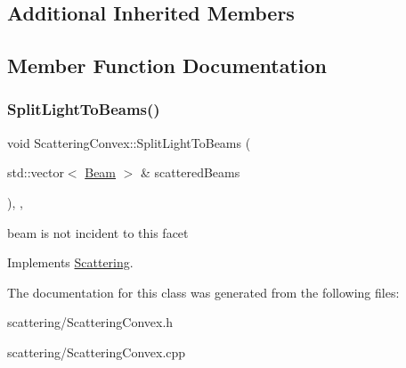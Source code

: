 \subsection*{Additional Inherited Members}


\subsection{Member Function Documentation}
\mbox{\label{class_scattering_convex_acb8aa7121ffd9dfb7bf1d51a0d68e93a}} 
\subsubsection{\texorpdfstring{Split\+Light\+To\+Beams()}{SplitLightToBeams()}}
{\footnotesize\ttfamily void Scattering\+Convex\+::\+Split\+Light\+To\+Beams (\begin{DoxyParamCaption}\item[{std\+::vector$<$ \mbox{\hyperlink{class_beam}{Beam}} $>$ \&}]{scattered\+Beams }\end{DoxyParamCaption})\hspace{0.3cm}{\ttfamily [override]}, {\ttfamily [protected]}, {\ttfamily [virtual]}}

beam is not incident to this facet 

Implements \mbox{\hyperlink{class_scattering}{Scattering}}.



The documentation for this class was generated from the following files\+:\begin{DoxyCompactItemize}
\item 
scattering/Scattering\+Convex.\+h\item 
scattering/Scattering\+Convex.\+cpp\end{DoxyCompactItemize}

